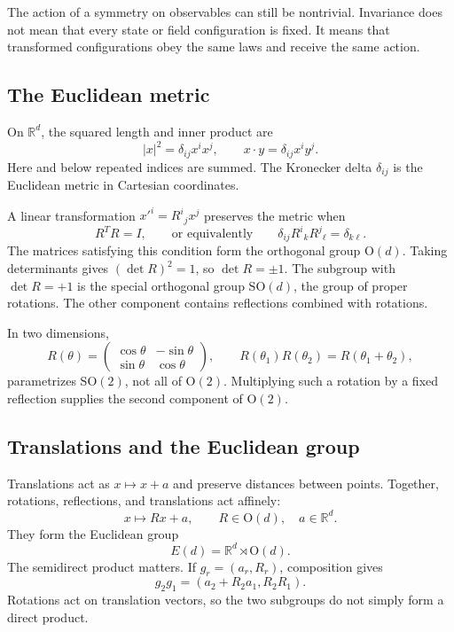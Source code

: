 \documentclass[11pt]{article}
\newcommand{\R}{\mathbb{R}}
\newcommand{\SO}{\mathrm{SO}}
\newcommand{\OO}{\mathrm{O}}
\begin{document}
The action of a symmetry on observables can still be nontrivial.  Invariance
does not mean that every state or field configuration is fixed.  It means
that transformed configurations obey the same laws and receive the same
action.

\subsection{The Euclidean metric}

On $\R^d$, the squared length and inner product are
\begin{equation}
  |x|^2=\delta_{ij}x^ix^j,
  \qquad
  x\cdot y=\delta_{ij}x^iy^j.
  \label{eq:euclideanmetric}
\end{equation}
Here and below repeated indices are summed.  The Kronecker delta
$\delta_{ij}$ is the Euclidean metric in Cartesian coordinates.

A linear transformation $x'^i=R^i{}_jx^j$ preserves the metric when
\begin{equation}
  R^T R=I,
  \qquad\text{or equivalently}\qquad
  \delta_{ij}R^i{}_kR^j{}_\ell=\delta_{k\ell}.
  \label{eq:orthogonalcondition}
\end{equation}
The matrices satisfying this condition form the orthogonal group $\OO(d)$.
Taking determinants gives $(\det R)^2=1$, so $\det R=\pm1$.  The subgroup
with $\det R=+1$ is the special orthogonal group $\SO(d)$, the group of proper
rotations.  The other component contains reflections combined with rotations.

In two dimensions,
\begin{equation}
  R(\theta)=
  \begin{pmatrix}
    \cos\theta&-\sin\theta\\
    \sin\theta& \cos\theta
  \end{pmatrix},
  \qquad
  R(\theta_1)R(\theta_2)=R(\theta_1+\theta_2),
  \label{eq:SO2rotation}
\end{equation}
parametrizes $\SO(2)$, not all of $\OO(2)$.  Multiplying such a rotation by a
fixed reflection supplies the second component of $\OO(2)$.

\subsection{Translations and the Euclidean group}

Translations act as $x\mapsto x+a$ and preserve distances between points.
Together, rotations, reflections, and translations act affinely:
\begin{equation}
  x\longmapsto Rx+a,
  \qquad R\in\OO(d),\quad a\in\R^d.
  \label{eq:affinetransformation}
\end{equation}
They form the Euclidean group
\begin{equation}
  E(d)=\R^d\rtimes\OO(d).
  \label{eq:Euclideangroup}
\end{equation}
The semidirect product matters.  If $g_r=(a_r,R_r)$, composition gives
\begin{equation}
  g_2g_1=(a_2+R_2a_1,R_2R_1).
  \label{eq:Euclideangrouplaw}
\end{equation}
Rotations act on translation vectors, so the two subgroups do not simply form
a direct product.
\end{document}

